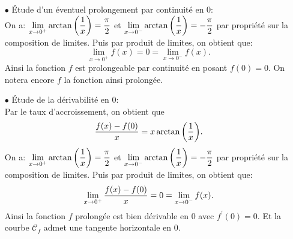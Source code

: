 \documentclass[a4paper, 11pt,reqno]{article}
\begin{document}
\begin{correction}
\begin{enumerate}
\begin{itemize}
\begin{itemize}
				            \item[$\star$] La droite d'\'equation $y=x$ est asymptote oblique \`a la courbe au voisinage de $-\infty$ et de $+\infty$.
				            \item[$\star$] La courbe est en-dessous de cette asymptote au voisinage de $+\infty$ et elle est au-dessus de cette asymptote au voisinage de $-\infty$.
			            \end{itemize}
			      \item[$\bullet$] \'Etude d'un \'eventuel prolongement par continuit\'e en 0:\\
			            \noindent On a: $\lim\limits_{x\to 0^+} \arctan{\left( \displaystyle\frac{1}{x} \right)}=\displaystyle\frac{\pi}{2}$ et $\lim\limits_{x\to 0^-} \arctan{\left( \displaystyle\frac{1}{x} \right)}=-\displaystyle\frac{\pi}{2}$ par propri\'et\'e sur la composition de limites. Puis par produit de limites, on obtient que:
			            $$\lim\limits_{x\to 0^+} f(x)=0=\lim\limits_{x\to 0^-} f(x).$$
			            Ainsi la fonction $f$ est prolongeable par continuit\'e en posant $f(0)=0$. On notera encore $f$ la fonction ainsi prolong\'ee.
			      \item[$\bullet$] \'Etude de la d\'erivabilit\'e en 0:\\
			            \noindent Par le taux d'accroissement, on obtient que
			            $$\displaystyle\frac{f(x)-f(0)}{x}=x\arctan{\left( \displaystyle\frac{1}{x} \right)}.$$
			            On a: $\lim\limits_{x\to 0^+} \arctan{\left( \displaystyle\frac{1}{x} \right)}=\displaystyle\frac{\pi}{2}$ et $\lim\limits_{x\to 0^-} \arctan{\left( \displaystyle\frac{1}{x} \right)}=-\displaystyle\frac{\pi}{2}$ par propri\'et\'e sur la composition de limites. Puis par produit de limites, on obtient que:
			            $$\lim\limits_{x\to 0^+} \displaystyle\frac{f(x)-f(0)}{x}=0=\lim\limits_{x\to 0^-} f(x).$$
			            Ainsi la fonction $f$ prolong\'ee est bien d\'erivable en 0 avec $f^{\prime}(0)=0$. Et la courbe $\mathcal{C}_f$ admet une tangente horizontale en 0.
		      \end{itemize}
	\end{enumerate}
\end{correction}


\vspace{0.5cm}
\end{document}

